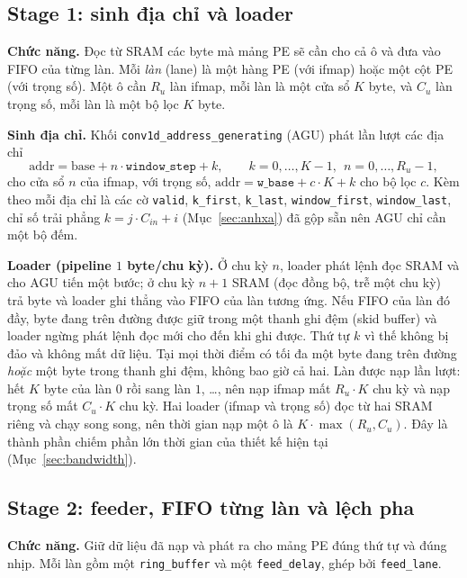 \subsection{Stage 1: sinh địa chỉ và loader}
\textbf{Chức năng.} Đọc từ SRAM các byte mà mảng PE sẽ cần cho cả ô và đưa vào FIFO của từng làn.
Mỗi \emph{làn} (lane) là một hàng PE (với ifmap) hoặc một cột PE (với trọng số). Một ô cần $R_u$ làn ifmap, mỗi làn là một cửa sổ $K$ byte, và $C_u$ làn trọng số, mỗi làn là một bộ lọc $K$ byte.

\textbf{Sinh địa chỉ.} Khối \texttt{conv1d\_address\_generating} (AGU) phát lần lượt các địa chỉ
\begin{equation}\label{eq:agu}
  \mathrm{addr}=\mathrm{base}+n\cdot\texttt{window\_step}+k,\qquad k=0,\dots,K-1,\ \ n=0,\dots,R_u-1,
\end{equation}
cho cửa sổ $n$ của ifmap, với trọng số, $\mathrm{addr}=\texttt{w\_base}+c\cdot K+k$ cho bộ lọc $c$.
Kèm theo mỗi địa chỉ là các cờ \texttt{valid}, \texttt{k\_first}, \texttt{k\_last}, \texttt{window\_first}, \texttt{window\_last}, chỉ số trải phẳng $k=j\cdot C_{in}+i$ (Mục~\ref{sec:anhxa}) đã gộp sẵn nên AGU chỉ cần một bộ đếm.

\textbf{Loader (pipeline $1$ byte/chu kỳ).} Ở chu kỳ $n$, loader phát lệnh đọc SRAM và cho AGU tiến một bước; ở chu kỳ $n+1$ SRAM (đọc đồng bộ, trễ một chu kỳ) trả byte và loader ghi thẳng vào FIFO của làn tương ứng.
Nếu FIFO của làn đó đầy, byte đang trên đường được giữ trong một thanh ghi đệm (skid buffer) và loader ngừng phát lệnh đọc mới cho đến khi ghi được. Thứ tự $k$ vì thế không bị đảo và không mất dữ liệu.
Tại mọi thời điểm có tối đa một byte đang trên đường \emph{hoặc} một byte trong thanh ghi đệm, không bao giờ cả hai.
Làn được nạp lần lượt: hết $K$ byte của làn $0$ rồi sang làn $1$, \dots, nên nạp ifmap mất $R_u\cdot K$ chu kỳ và nạp trọng số mất $C_u\cdot K$ chu kỳ.
Hai loader (ifmap và trọng số) đọc từ hai SRAM riêng và chạy song song, nên thời gian nạp một ô là $K\cdot\max(R_u,C_u)$.
Đây là thành phần chiếm phần lớn thời gian của thiết kế hiện tại (Mục~\ref{sec:bandwidth}).

\subsection{Stage 2: feeder, FIFO từng làn và lệch pha}
\textbf{Chức năng.} Giữ dữ liệu đã nạp và phát ra cho mảng PE đúng thứ tự và đúng nhịp.
Mỗi làn gồm một \texttt{ring\_buffer} và một \texttt{feed\_delay}, ghép bởi \texttt{feed\_lane}.

